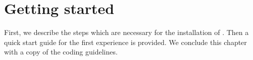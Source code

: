 \chapter{Getting started}

First, we describe the steps which are necessary for the installation of \Dumux. Then a quick start guide for the first \Dumux experience is provided. We conclude this chapter with a copy of the \Dune coding guidelines. 





